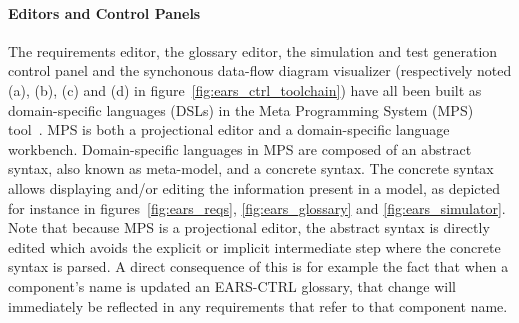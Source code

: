\paragraph{\textbf{Editors and Control Panels}\\} 
\hspace{-.2cm}
The requirements editor, the glossary editor, the simulation and
test generation control panel and the synchonous data-flow diagram visualizer (respectively
noted (\textsf{a}), (\textsf{b}), (\textsf{c}) and (\textsf{d}) in figure~\ref{fig:ears_ctrl_toolchain}) have all been built as 
domain-specific languages (DSLs) in the Meta Programming System (MPS)
tool~\cite{mps}.
MPS is both a projectional editor and a domain-specific language workbench.
Domain-specific languages in MPS are composed of an abstract syntax, also known
as meta-model, and a concrete syntax. The concrete syntax allows displaying
and/or editing the information present in a model, as depicted for instance in
figures~\ref{fig:ears_reqs}, \ref{fig:ears_glossary} and 
\ref{fig:ears_simulator}. Note that because MPS is a projectional editor, the
abstract syntax is directly edited which avoids the explicit or implicit
intermediate step where the concrete syntax is parsed.
A direct consequence of this is for example the fact that when a component's
name is updated an \textsf{EARS-CTRL} glossary, that change will immediately be
reflected in any requirements that refer to that component name.\vspace{-.2cm}
